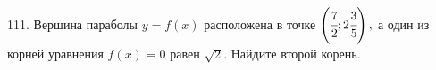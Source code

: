 111. Вершина параболы $y=f(x)$ расположена в точке $\left(\cfrac{7}{2};2\cfrac{3}{5}\right),$ а один из корней уравнения $f(x)=0$
равен $\sqrt{2}.$ Найдите второй корень.\\
